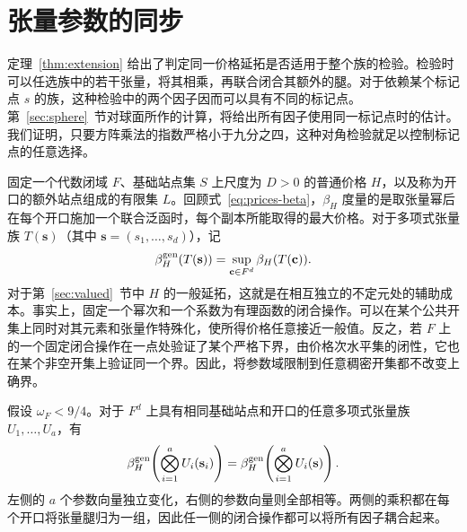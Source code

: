 \section{张量参数的同步}\label{sec:sync}

定理~\ref{thm:extension} 给出了判定同一价格延拓是否适用于整个族的检验。检验时可以任选族中的若干张量，将其相乘，再联合闭合其额外的腿。对于依赖某个标记点 $s$ 的族，这种检验中的两个因子因而可以具有不同的标记点。第~\ref{sec:sphere}~节对球面所作的计算，将给出所有因子使用同一标记点时的估计。我们证明，只要方阵乘法的指数严格小于九分之四，这种对角检验就足以控制标记点的任意选择。

固定一个代数闭域 $F$、基础站点集 $S$ 上尺度为 $D>0$ 的普通价格 $H$，以及称为开口的额外站点组成的有限集 $L$。回顾式~\eqref{eq:prices-beta}，$\beta_H$ 度量的是取张量幂后在每个开口施加一个联合泛函时，每个副本所能取得的最大价格。对于多项式张量族 $T(\mathbf s)$（其中 $\mathbf s=(s_1,\ldots,s_d)$），记
\[
 \beta_H^{\rm gen}(T(\mathbf s))
    =\sup_{\mathbf c\in F^d}\beta_H(T(\mathbf c)).
\]
对于第~\ref{sec:valued}~节中 $H$ 的一般延拓，这就是在相互独立的不定元处的辅助成本。事实上，固定一个幂次和一个系数为有理函数的闭合操作。可以在某个公共开集上同时对其元素和张量作特殊化，使所得价格任意接近一般值。反之，若 $F$ 上的一个固定闭合操作在一点处验证了某个严格下界，由价格次水平集的闭性，它也在某个非空开集上验证同一个界。因此，将参数域限制到任意稠密开集都不改变上确界。

\begin{theorem}[同步]\label{thm:sync}
假设 $\omega_F<9/4$。对于 $F^d$ 上具有相同基础站点和开口的任意多项式张量族 $U_1,\ldots,U_a$，有
\[
 \beta_H^{\rm gen}\!\left(\bigotimes_{i=1}^a U_i(\mathbf s_i)\right)
 =
 \beta_H^{\rm gen}\!\left(\bigotimes_{i=1}^a U_i(\mathbf s)\right).
\]
左侧的 $a$ 个参数向量独立变化，右侧的参数向量则全部相等。两侧的乘积都在每个开口将张量腿归为一组，因此任一侧的闭合操作都可以将所有因子耦合起来。
\end{theorem}

